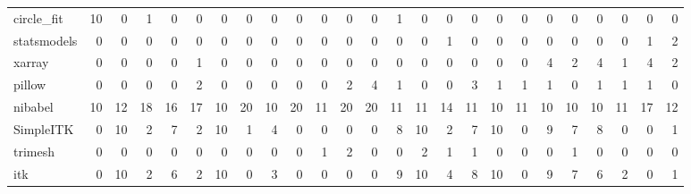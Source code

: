 \begin{tabular}{lrrrrrrrrrrrrrrrrrrrrrrrr}
circle\_fit & 10 & 0 & 1 & 0 & 0 & 0 & 0 & 0 & 0 & 0 & 0 & 0 & 1 & 0 & 0 & 0 & 0 & 0 & 0 & 0 & 0 & 0 & 0 & 0 \\
statsmodels & 0 & 0 & 0 & 0 & 0 & 0 & 0 & 0 & 0 & 0 & 0 & 0 & 0 & 0 & 1 & 0 & 0 & 0 & 0 & 0 & 0 & 0 & 1 & 2 \\
xarray & 0 & 0 & 0 & 0 & 1 & 0 & 0 & 0 & 0 & 0 & 0 & 0 & 0 & 0 & 0 & 0 & 0 & 0 & 4 & 2 & 4 & 1 & 4 & 2 \\
pillow & 0 & 0 & 0 & 0 & 2 & 0 & 0 & 0 & 0 & 0 & 2 & 4 & 1 & 0 & 0 & 3 & 1 & 1 & 1 & 0 & 1 & 1 & 1 & 0 \\
nibabel & 10 & 12 & 18 & 16 & 17 & 10 & 20 & 10 & 20 & 11 & 20 & 20 & 11 & 11 & 14 & 11 & 10 & 11 & 10 & 10 & 10 & 11 & 17 & 12 \\
SimpleITK & 0 & 10 & 2 & 7 & 2 & 10 & 1 & 4 & 0 & 0 & 0 & 0 & 8 & 10 & 2 & 7 & 10 & 0 & 9 & 7 & 8 & 0 & 0 & 1 \\
trimesh & 0 & 0 & 0 & 0 & 0 & 0 & 0 & 0 & 0 & 1 & 2 & 0 & 0 & 2 & 1 & 1 & 0 & 0 & 0 & 1 & 0 & 0 & 0 & 0 \\
itk & 0 & 10 & 2 & 6 & 2 & 10 & 0 & 3 & 0 & 0 & 0 & 0 & 9 & 10 & 4 & 8 & 10 & 0 & 9 & 7 & 6 & 2 & 0 & 1 \\
\bottomrule
\end{tabular}
